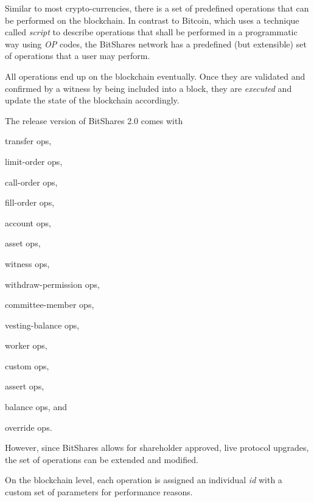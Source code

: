 Similar to most crypto-currencies, there is a set of predefined operations that
can be performed on the blockchain. In contrast to Bitcoin, which uses a
technique called \emph{script} to describe operations that shall be performed
in a programmatic way using \emph{OP} codes, the BitShares network has a
predefined (but extensible) set of operations that a user may perform.

All operations end up on the blockchain eventually. Once they are validated and
confirmed by a witness by being included into a block, they are \emph{executed}
and update the state of the blockchain accordingly.

The release version of BitShares 2.0 comes with 
\begin{inparaenum}[(a)]
 \item transfer ops,
 \item limit-order ops,
 \item call-order ops,
 \item fill-order ops,
 \item account ops,
 \item asset ops,
 \item witness ops,
 \item withdraw-permission ops,
 \item committee-member ops,
 \item vesting-balance ops,
 \item worker ops,
 \item custom ops,
 \item assert ops,
 \item balance ops, and
 \item override ops.
\end{inparaenum}
However, since BitShares allows for shareholder approved, live protocol
upgrades, the set of operations can be extended and modified. 

On the blockchain level, each operation is assigned an individual \emph{id}
with a custom set of parameters for performance reasons.

